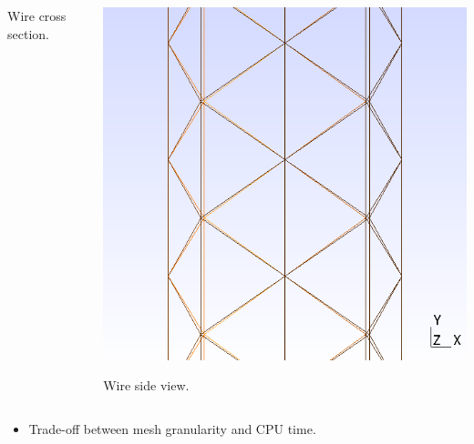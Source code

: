 \documentclass[xcolor=dvipsnames]{beamer}
\begin{document}
\begin{frame}
\begin{columns}
\begin{column}{0.5\textwidth}
\begin{center}
        \scriptsize Wire cross section.
      \end{center}
    \end{column}
    \begin{column}{0.5\textwidth}
      \begin{center}
        \includegraphics[height=0.6\textheight]{wire-side-section.png}

        \scriptsize Wire side view.
      \end{center}
    \end{column}
  \end{columns}
  
  \begin{itemize}
  \item Trade-off between mesh granularity and CPU time.
  \end{itemize}
\end{frame}
\end{document}

